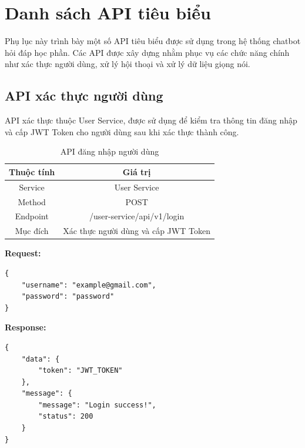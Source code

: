\documentclass[../DoAn.tex]{subfiles}
\begin{document}
\section{Danh sách API tiêu biểu}

Phụ lục này trình bày một số API tiêu biểu được sử dụng trong hệ thống chatbot hỏi đáp học phần. Các API được xây dựng nhằm phục vụ các chức năng chính như xác thực người dùng, xử lý hội thoại và xử lý dữ liệu giọng nói.

\subsection{API xác thực người dùng}

API xác thực thuộc User Service, được sử dụng để kiểm tra thông tin đăng nhập và cấp JWT Token cho người dùng sau khi xác thực thành công.

\begin{table}[H]
    \centering
    \renewcommand{\arraystretch}{1.8}
    \begin{tabular}{|c|c|}
        \hline
        \textbf{Thuộc tính} & \textbf{Giá trị}                     \\
        \hline
        Service             & User Service                         \\
        \hline
        Method              & POST                                 \\
        \hline
        Endpoint            & /user-service/api/v1/login           \\
        \hline
        Mục đích            & Xác thực người dùng và cấp JWT Token \\
        \hline
    \end{tabular}
    \caption{API đăng nhập người dùng}

\end{table}


\textbf{Request:}

\begin{verbatim}
{
    "username": "example@gmail.com",
    "password": "password"
}
\end{verbatim}


\textbf{Response:}

\begin{verbatim}
{
    "data": {
        "token": "JWT_TOKEN"
    },
    "message": {
        "message": "Login success!",
        "status": 200
    }
}
\end{verbatim}
\clearpage
\end{document}
